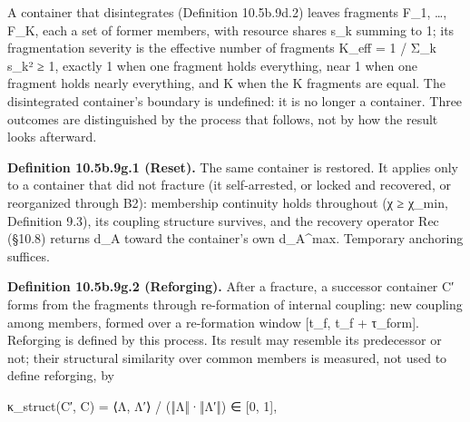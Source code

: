 \documentclass[
]{article}
\begin{document}
A container that disintegrates (Definition 10.5b.9d.2) leaves fragments
F\_1, \ldots, F\_K, each a set of former members, with resource shares
s\_k summing to 1; its fragmentation severity is the effective number of
fragments K\_eff = 1 / Σ\_k s\_k² ≥ 1, exactly 1 when one fragment holds
everything, near 1 when one fragment holds nearly everything, and K when
the K fragments are equal. The disintegrated container's boundary is
undefined: it is no longer a container. Three outcomes are distinguished
by the process that follows, not by how the result looks afterward.

\textbf{Definition 10.5b.9g.1 (Reset).} The same container is restored.
It applies only to a container that did not fracture (it self-arrested,
or locked and recovered, or reorganized through B2): membership
continuity holds throughout (χ ≥ χ\_min, Definition 9.3), its coupling
structure survives, and the recovery operator Rec (§10.8) returns d\_A
toward the container's own d\_A\^{}max. Temporary anchoring suffices.

\textbf{Definition 10.5b.9g.2 (Reforging).} After a fracture, a
successor container C′ forms from the fragments through re-formation of
internal coupling: new coupling among members, formed over a
re-formation window {[}t\_f, t\_f + τ\_form{]}. Reforging is defined by
this process. Its result may resemble its predecessor or not; their
structural similarity over common members is measured, not used to
define reforging, by

κ\_struct(C′, C) = ⟨Λ, Λ′⟩ / (‖Λ‖·‖Λ′‖) ∈ {[}0, 1{]},
\end{document}
